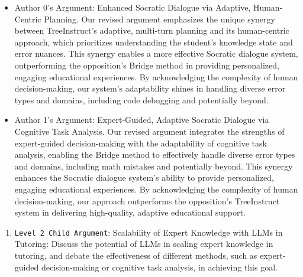 \begin{enumerate}
\begin{enumerate}
        \begin{itemize}
            \item Author 0's Argument: Enhanced Socratic Dialogue via Adaptive, Human-Centric Planning. Our revised argument emphasizes the unique synergy between TreeInstruct's adaptive, multi-turn planning and its human-centric approach, which prioritizes understanding the student's knowledge state and error nuances. This synergy enables a more effective Socratic dialogue system, outperforming the opposition's Bridge method in providing personalized, engaging educational experiences. By acknowledging the complexity of human decision-making, our system's adaptability shines in handling diverse error types and domains, including code debugging and potentially beyond.
		\item Author 1's Argument: Expert-Guided, Adaptive Socratic Dialogue via Cognitive Task Analysis. Our revised argument integrates the strengths of expert-guided decision-making with the adaptability of cognitive task analysis, enabling the Bridge method to effectively handle diverse error types and domains, including math mistakes and potentially beyond. This synergy enhances the Socratic dialogue system's ability to provide personalized, engaging educational experiences. By acknowledging the complexity of human decision-making, our approach outperforms the opposition's TreeInstruct system in delivering high-quality, adaptive educational support.
        \end{itemize}
    \end{enumerate}

    \begin{enumerate}
        \item \texttt{Level 2 Child Argument}: Scalability of Expert Knowledge with LLMs in Tutoring: Discuss the potential of LLMs in scaling expert knowledge in tutoring, and debate the effectiveness of different methods, such as expert-guided decision-making or cognitive task analysis, in achieving this goal.


\end{enumerate}
\end{enumerate}
